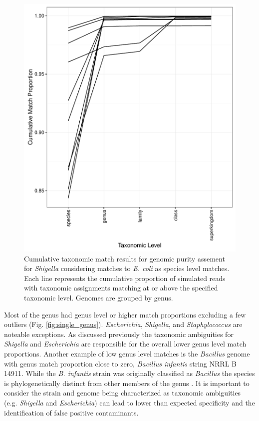 \documentclass[fleqn,10pt,lineno]{wlpeerj}\usepackage[]{graphicx}\usepackage[]{color}
\makeatletter
\def\maxwidth{ %
  \ifdim\Gin@nat@width>\linewidth
    \linewidth
  \else
    \Gin@nat@width
  \fi
}
\newenvironment{knitrout}{}{} %
\makeatother
\begin{document}
\begin{knitrout}
\color{fgcolor}\begin{figure}

{\centering \includegraphics[width=\maxwidth]{figure/shigella_ec_cum-1} 

}

\caption{Cumulative taxonomic match results for genomic purity assement for \textit{Shigella} considering matches to \textit{E. coli} as species level matches.  Each line represents the cumulative proportion of simulated reads with taxonomic assignments matching at or above the specified taxonomic level. Genomes are grouped by genus.}\label{fig:shigella_ec_cum}
\end{figure}


\end{knitrout}

Most of the genus had genus level or higher match proportions excluding a few outliers (Fig. \ref{fig:single_genus}). 
\textit{Escherichia}, \textit{Shigella}, and \textit{Staphylococcus} are noteable exceptions. 
As discussed previously the taxonomic ambiguities for \textit{Shigella} and \textit{Escherichia} are responsible for the overall lower genus level match proportions. Another example of low genus level matches is the \textit{Bacillus} genome with genus match proportion close to zero, \textit{Bacillus infantis} string NRRL B 14911. While the \textit{B. infantis} strain was originally classified as \textit{Bacillus} the species is phylogenetically distinct from other members of the genus \citep{ko2006bacillus}.
It is important to consider the strain and genome being characterized as taxonomic ambiguities (e.g. \textit{Shigella} and \textit{Escherichia}) can lead to lower than expected specificity and the identification of false positive contaminants.  
\end{document}
